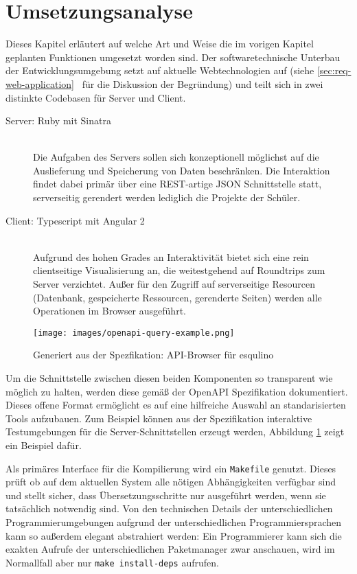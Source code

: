\section{Umsetzungsanalyse}
\label{sec:implementation-analysis}

Dieses Kapitel erläutert auf welche Art und Weise die im vorigen Kapitel geplanten Funktionen umgesetzt worden sind. Der softwaretechnische Unterbau der Entwicklungsumgebung setzt auf aktuelle Webtechnologien auf (siehe \ref{sec:req-web-application}~ für die Diskussion der Begründung) und teilt sich in zwei distinkte Codebasen für Server und Client.

\begin{description}
\item[Server: Ruby mit Sinatra] \hfill\\
  Die Aufgaben des Servers sollen sich konzeptionell möglichst auf die Auslieferung und Speicherung von Daten beschränken. Die Interaktion findet dabei primär über eine REST-artige JSON Schnittstelle statt, serverseitig gerendert werden lediglich die Projekte der Schüler.
\item[Client: Typescript mit Angular 2] \hfill\\
  Aufgrund des hohen Grades an Interaktivität bietet sich eine rein clientseitige Visualisierung an, die weitestgehend auf Roundtrips zum Server verzichtet. Außer für den Zugriff auf serverseitige Resourcen (Datenbank, gespeicherte Ressourcen, gerenderte Seiten) werden alle Operationen im Browser ausgeführt.
\end{description}

\begin{figure}[p]
  \centering \texttt{[image: images/openapi-query-example.png]}
  \caption{Generiert aus der Spezfikation: API-Browser für esqulino}
  \label{fig:openapi-query-example}
\end{figure}

Um die Schnittstelle zwischen diesen beiden Komponenten so transparent wie möglich zu halten, werden diese gemäß der OpenAPI Spezifikation \cite{open-api} dokumentiert. Dieses offene Format ermöglicht es auf eine hilfreiche Auswahl an standarisierten Tools aufzubauen. Zum Beispiel können aus der Spezifikation interaktive Testumgebungen für die Server-Schnittstellen erzeugt werden, Abbildung \ref{fig:openapi-query-example} zeigt ein Beispiel dafür.

Als primäres Interface für die Kompilierung wird ein \lstinline{Makefile} genutzt. Dieses prüft ob auf dem aktuellen System alle nötigen Abhängigkeiten verfügbar sind und stellt sicher, dass Übersetzungsschritte nur ausgeführt werden, wenn sie tatsächlich notwendig sind. Von den technischen Details der unterschiedlichen Programmierumgebungen aufgrund der unterschiedlichen Programmiersprachen kann so außerdem elegant abstrahiert werden: Ein Programmierer kann sich die exakten Aufrufe der unterschiedlichen Paketmanager zwar anschauen, wird im Normallfall aber nur \lstinline{make install-deps} aufrufen.


